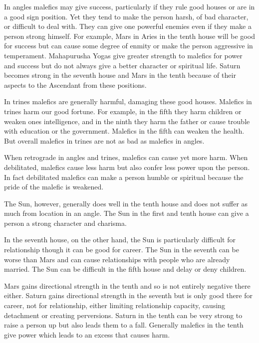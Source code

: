 In angles malefics may give success, particularly if they rule good houses or are in a good sign position. Yet they tend to make the person harsh, of bad character, or difficult to deal with. They can give one powerful enemies even if they make a person strong himself. For example, Mars in Aries in the tenth house will be good for success but can cause some degree of enmity or make the person aggressive in temperament. Mahapurusha Yogas give greater strength to malefics for power and success but do not always give a better character or spiritual life. Saturn becomes strong in the seventh house and Mars in the tenth because of their aspects to the Ascendant from these positions.

 

In trines malefics are generally harmful, damaging these good houses.  Malefics in trines harm our good fortune. For example, in the fifth they harm children or weaken ones intelligence, and in the ninth they harm the father or cause trouble with education or the government. Malefics in the fifth can weaken the health. But overall malefics in trines are not as bad as malefics in angles.

When retrograde in angles and trines, malefics can cause yet more harm. When debilitated, malefics cause less harm but also confer less power upon the person. In fact debilitated malefics can make a person humble or spiritual because the pride of the malefic is weakened.

 

The Sun, however, generally does well in the tenth house and does not suffer as much from location in an angle. The Sun in the first and tenth house can give a person a strong character and charisma.

 

In the seventh house, on the other hand, the Sun is particularly difficult for relationship though it can be good for career. The Sun in the seventh can be worse than Mars and can cause relationships with people who are already married. The Sun can be difficult in the fifth house and delay or deny children.

 

Mars gains directional strength in the tenth and so is not entirely negative there either. Saturn gains directional strength in the seventh but is only good there for career, not for relationship, either limiting relationship capacity, causing detachment or creating perversions. Saturn in the tenth can be very strong to raise a person up but also leads them to a fall. Generally malefics in the tenth give power which leads to an excess that causes harm.

